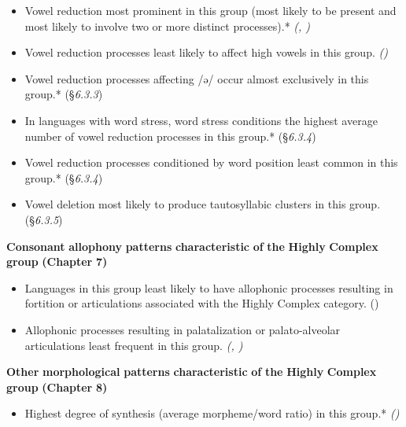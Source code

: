 \begin{itemize}
\item 
Vowel reduction most prominent in this group (most likely to be present and most likely to involve two or more distinct processes).* \textit{(, )}

\item 
Vowel reduction processes least likely to affect high vowels in this group. \textit{()}

\item 
Vowel reduction processes affecting /ə/ occur almost exclusively in this group.* (§\textit{6.3.3})

\item 
In languages with word stress, word stress conditions the highest average number of vowel reduction processes in this group.* (§\textit{6.3.4})

\item 
Vowel reduction processes conditioned by word position least common in this group.* (§\textit{6.3.4})

\item 
Vowel deletion most likely to produce tautosyllabic clusters in this group. (§\textit{6.3.5})

\end{itemize}

\textbf{Consonant} \textbf{allophony} \textbf{patterns} \textbf{characteristic} \textbf{of} \textbf{the} \textbf{Highly} \textbf{Complex} \textbf{group} \textbf{(Chapter} \textbf{7)}

\begin{itemize}
\item 
Languages in this group least likely to have allophonic processes resulting in fortition or articulations associated with the Highly Complex category. (\textit{})

\item 
Allophonic processes resulting in palatalization or palato-alveolar articulations least frequent in this group. \textit{(, )}

\end{itemize}

\textbf{Other} \textbf{morphological} \textbf{patterns} \textbf{characteristic} \textbf{of} \textbf{the} \textbf{Highly} \textbf{Complex} \textbf{group} \textbf{(Chapter} \textbf{8)}

\begin{itemize}
\item 
Highest degree of synthesis (average morpheme/word ratio) in this group.* \textit{()}

\end{itemize}

